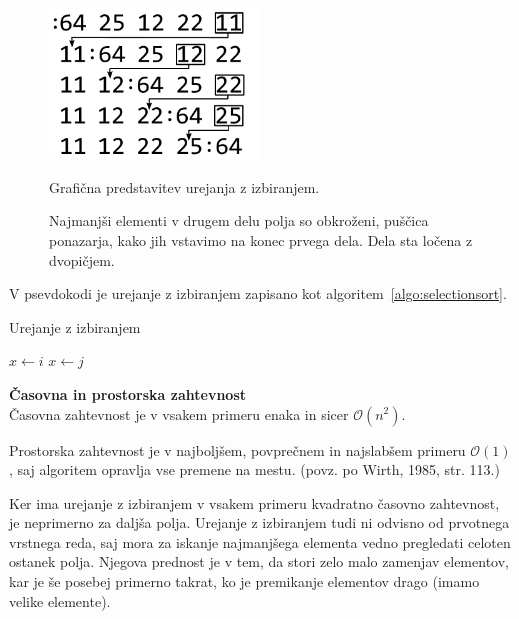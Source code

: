 \documentclass[a4paper,oneside,12pt]{article}
\newcommand{\subsubsubsection}[1]{\vspace*{1ex}\textbf{#1}\\}
\begin{document}
\begin{figure}[ht]
    \begin{center}
        \includegraphics[height=40mm]{slike/selectionsort.pdf}
    \end{center}
    \vspace{-0.7cm}
    \caption[Urejanje z izbiranjem]{Grafična predstavitev urejanja z izbiranjem.}
    \caption*{{\small Najmanjši elementi v drugem delu polja so obkroženi, puščica ponazarja, kako jih
    vstavimo na konec prvega dela. Dela sta ločena z dvopičjem.}}
    \label{fig:selectionsortimage}
\end{figure}

V psevdokodi je urejanje z izbiranjem zapisano kot algoritem~\ref{algo:selectionsort}.

\begin{algorithm}[h!t!]
  \caption{Urejanje z izbiranjem}\label{algo:selectionsort}
  \begin{algorithmic}[1]
            \State $x \gets i$
                    \State $x \gets j$
                \EndIf
            \EndFor
        \EndFor
    \EndFunction
  \end{algorithmic}
\end{algorithm}

\subsubsubsection{Časovna in prostorska zahtevnost} \nopagebreak
Časovna zahtevnost je v vsakem primeru enaka in sicer $\mathcal{O}(n^2)$.

Prostorska zahtevnost je v najboljšem, povprečnem in najslabšem primeru $\mathcal{O}(1)$, 
saj algoritem opravlja vse premene na mestu.
(povz. po Wirth, 1985, str. 113.) 

Ker ima urejanje z izbiranjem v vsakem primeru kvadratno časovno zahtevnost, je neprimerno
za daljša polja. Urejanje z izbiranjem tudi ni odvisno od prvotnega vrstnega reda,
saj mora za iskanje najmanjšega elementa vedno pregledati celoten ostanek polja.
Njegova prednost je v tem, da stori zelo malo zamenjav elementov, kar je še posebej
primerno takrat, ko je premikanje elementov drago (imamo velike elemente).
\end{document}
